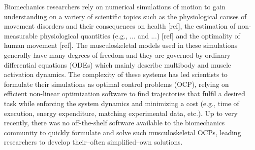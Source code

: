 Biomechanics researchers rely on numerical simulations of motion to gain understanding on a variety of scientific topics such as the physiological causes of movement disorders and their consequences on health [ref], the estimation of non-measurable physiological quantities (e.g., ... and ...) [ref] and the optimality of human movement [ref].
The musculoskeletal models used in these simulations generally have many degrees of freedom and they are governed by ordinary differential equations (ODEs) which mainly describe multibody and muscle activation dynamics.
The complexity of these systems has led scientists to formulate their simulations as optimal control problems (OCP), relying on efficient non-linear optimization software to find trajectories that fulfil a desired task while enforcing the system dynamics and minimizing a cost (e.g., time of execution, energy expenditure, matching experimental data, etc.).
Up to very recently, there was no off-the-shelf software available to the biomechanics community to quickly formulate and solve such musculoskeletal OCPs, leading researchers to develop their--often simplified--own solutions.

